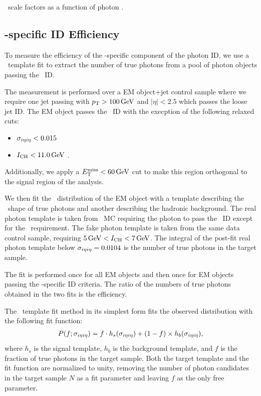 \begin{table}[htbp]
  \begin{center}
    \caption{\egamma\ scale factors as a function of photon \pt.}
    \label{tab:idsf_results}
    
  \end{center}
\end{table}

\subsection{\Pgg-specific ID Efficiency}
\label{subsec:pvsf}

To measure the efficiency of the \Pgg-specific component of the photon ID, we use a \sieie\ template fit to extract the number of true photons from a pool of photon objects passing the \egamma\ ID.

The measurement is performed over a EM object+jet control sample where we require one jet passing with $p_{\mathrm{T}} > 100\,\text{Ge\hspace{-.08em}V}$ and $|\eta| < 2.5$ which passes the loose jet ID. 
The EM object passes the \egamma\ ID with the execption of the following relaxed cuts: 
\begin{itemize}
\item $\sigma_{i\eta i\eta} < 0.015$
\item $I_{\text{CH}} < 11.0\,\text{Ge\hspace{-.08em}V}$ .
\end{itemize}
Additionally, we apply a $E_{\mathrm{T}}^{\text{miss}} < 60\,\text{Ge\hspace{-.08em}V}$ cut to make this region orthogonal to the signal region of the analysis.

We then fit the \sieie\ distribution of the EM object with a template describing the \sieie\ shape of true photons and another describing the hadronic background. 
The real photon template is taken from \gj\ MC requiring the photon to pass the \egamma\ ID except for the \sieie\ requirement.
The fake photon template is taken from the same data control sample, requiring $5\,\text{Ge\hspace{-.08em}V} < I_{\text{CH}}
< 7\,\text{Ge\hspace{-.08em}V}$. 
The integral of the post-fit real photon template below $\sigma_{i\eta i\eta} = 0.0104$ is the number of true photons in the target sample.

The fit is performed once for all EM objects and then once for EM objects passing the \Pgg-specific ID criteria. 
The ratio of the numbers of true photons obtained in the two fits is the efficiency.

The \sieie\ template fit method in its simplest form fits the observed distribution with the following fit function:
\begin{align}
  P(f;\sigma_{i\eta i\eta}) = f \cdot h_{s}(\sigma_{i\eta i\eta}) + (1 - f) \times h_{b}(\sigma_{i\eta i\eta}),
\end{align}
where $h_{s}$ is the signal template, $h_{b}$ is the background template, and $f$ is the fraction of true photons in the target sample. 
Both the target template and the fit function are normalized to unity, removing the number of photon candidates in the target sample $N$ as a fit parameter and leaving $f$ as the only free parameter.

